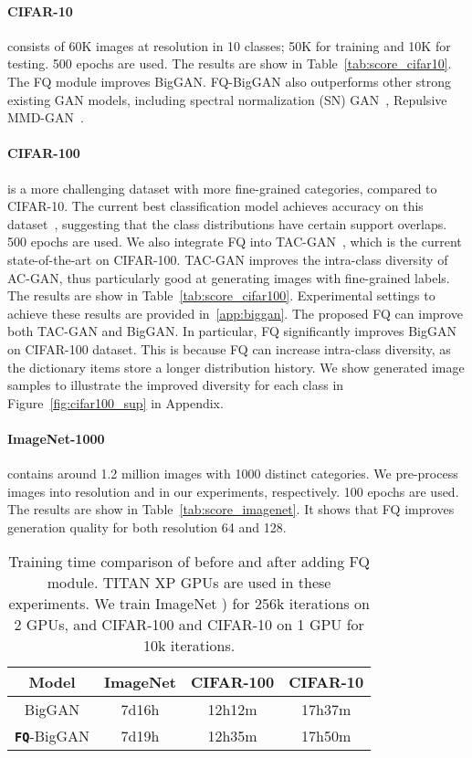 \documentclass{article}
\begin{document}
\paragraph{CIFAR-10}\citep{krizhevsky2009learning} consists of 60K images at resolution  in 10 classes; 50K for training and 10K for testing. 500 epochs are used. The results are show in Table~\ref{tab:score_cifar10}. The FQ module improves BigGAN.  FQ-BigGAN also outperforms other strong existing GAN models, including spectral normalization (SN) GAN~\cite{miyato2018spectral}, Repulsive MMD-GAN~\cite{wang2019improving}. 

\paragraph{CIFAR-100} is a more challenging dataset with more fine-grained categories, compared to CIFAR-10.  The current best classification model achieves  accuracy on this dataset~\cite{huang2019gpipe}, suggesting that the class distributions have certain support overlaps.  500 epochs are used.  We also integrate FQ into TAC-GAN~\cite{gong2019twin}, which is the current state-of-the-art on CIFAR-100. TAC-GAN improves the intra-class diversity of AC-GAN, thus particularly good at generating images with fine-grained labels. The results are show in Table~\ref{tab:score_cifar100}. Experimental settings to achieve these results are provided in~\ref{app:biggan}. The proposed FQ can improve both TAC-GAN and BigGAN. In particular, FQ significantly improves BigGAN on CIFAR-100 dataset. This is because FQ can increase intra-class diversity, as the dictionary items store a longer distribution history. We show generated image samples to illustrate the improved diversity for each class in Figure~\ref{fig:cifar100_sup} in Appendix.


\paragraph{ImageNet-1000}\citep{russakovsky2015imagenet} contains around 1.2 million images with 1000 distinct categories. We pre-process images into resolution  and  in our experiments, respectively. 100 epochs are used.
The results are show in Table~\ref{tab:score_imagenet}. It shows that FQ improves generation quality for both resolution 64 and 128.


\begin{table}[!t]
    \centering
    \begin{tabular}{c|c|c|c}
    \toprule
    Model & ImageNet & CIFAR-100 & CIFAR-10\\  \midrule
          BigGAN    & 7d16h &  12h12m & 17h37m\\
          \textbf{\texttt{FQ}}-BigGAN  & 7d19h & 12h35m & 17h50m\\
    \bottomrule
    \end{tabular}
    \caption{Training time comparison of before and after adding FQ module.  TITAN XP GPUs are used in these experiments. We train ImageNet ) for 256k iterations on 2 GPUs, and CIFAR-100 and CIFAR-10 on 1 GPU for 10k iterations.}
    \label{tab:time_cost}
\end{table}
\end{document}
